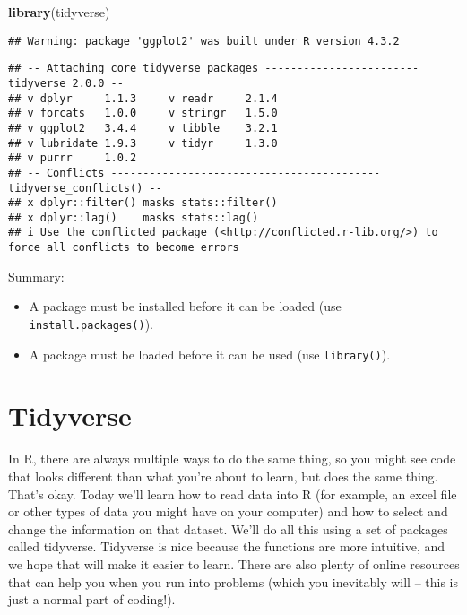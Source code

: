 \documentclass[
]{article}
\newenvironment{Shaded}{\begin{snugshade}}{\end{snugshade}}
\newcommand{\FunctionTok}[1]{\textcolor[rgb]{0.13,0.29,0.53}{\textbf{#1}}}
\newcommand{\NormalTok}[1]{#1}
\providecommand{\tightlist}{%
  \setlength{\itemsep}{0pt}\setlength{\parskip}{0pt}}
\begin{document}
\begin{Shaded}
\begin{Highlighting}[]
\FunctionTok{library}\NormalTok{(tidyverse)}
\end{Highlighting}
\end{Shaded}

\begin{verbatim}
## Warning: package 'ggplot2' was built under R version 4.3.2
\end{verbatim}

\begin{verbatim}
## -- Attaching core tidyverse packages ------------------------ tidyverse 2.0.0 --
## v dplyr     1.1.3     v readr     2.1.4
## v forcats   1.0.0     v stringr   1.5.0
## v ggplot2   3.4.4     v tibble    3.2.1
## v lubridate 1.9.3     v tidyr     1.3.0
## v purrr     1.0.2     
## -- Conflicts ------------------------------------------ tidyverse_conflicts() --
## x dplyr::filter() masks stats::filter()
## x dplyr::lag()    masks stats::lag()
## i Use the conflicted package (<http://conflicted.r-lib.org/>) to force all conflicts to become errors
\end{verbatim}

Summary:

\begin{itemize}
\tightlist
\item
  A package must be installed before it can be loaded (use
  \texttt{install.packages()}).
\item
  A package must be loaded before it can be used (use
  \texttt{library()}).
\end{itemize}

\hypertarget{tidyverse}{%
\section{Tidyverse}\label{tidyverse}}

In R, there are always multiple ways to do the same thing, so you might
see code that looks different than what you're about to learn, but does
the same thing. That's okay. Today we'll learn how to read data into R
(for example, an excel file or other types of data you might have on
your computer) and how to select and change the information on that
dataset. We'll do all this using a set of packages called tidyverse.
Tidyverse is nice because the functions are more intuitive, and we hope
that will make it easier to learn. There are also plenty of online
resources that can help you when you run into problems (which you
inevitably will -- this is just a normal part of coding!).
\end{document}
